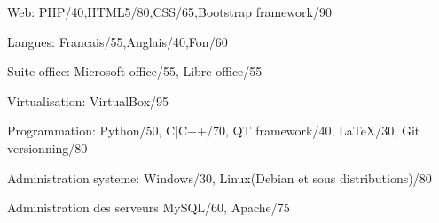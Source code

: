 


\begin{cvskills}


\cvskill
{Web:} %
{{PHP/40},{HTML5/80},{CSS/65},{Bootstrap framework/90}} %


\cvskill
{Langues:} %
{Francais/55,Anglais/40,Fon/60} %


\cvskill
{Suite office:} %
{Microsoft office/55, Libre office/55} %


\cvskill
{Virtualisation:} %
{VirtualBox/95} %


\cvskill
{Programmation:} %
{Python/50, C|C++/70, QT framework/40, LaTeX/30, Git versionning/80} %


\cvskill
{Administration systeme:} %
{Windows/30, Linux(Debian et sous distributions)/80} %


\cvskill
{Administration des serveurs} %
{MySQL/60, Apache/75} %


\end{cvskills}